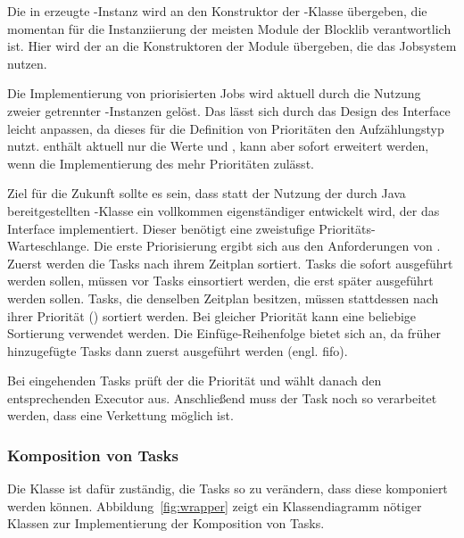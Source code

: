 Die in \classGame{} erzeugte \classBlocklibExecutor{}-Instanz wird an den Konstruktor der \classContext{}-Klasse übergeben, die momentan für die Instanziierung der meisten Module der Blocklib verantwortlich ist. Hier wird der \classBlocklibExecutor{} an die Konstruktoren der Module übergeben, die das Jobsystem nutzen.

Die Implementierung von priorisierten Jobs wird aktuell durch die Nutzung zweier getrennter \classExecutor{}-Instanzen gelöst. Das lässt sich durch das Design des Interface \classBlocklibExecutorService{} leicht anpassen, da dieses für die Definition von Prioritäten den Aufzählungstyp \classTaskPriority{} nutzt. \classTaskPriority{} enthält aktuell nur die Werte  und , kann aber sofort erweitert werden, wenn die Implementierung des \classBlocklibExecutorService{} mehr Prioritäten zulässt. 

Ziel für die Zukunft sollte es sein, dass statt der Nutzung der durch Java bereitgestellten \classScheduledThreadPoolExecutor{}-Klasse ein vollkommen eigenständiger \classExecutorService{} entwickelt wird, der das Interface \classBlocklibExecutorService{} implementiert. Dieser benötigt eine zweistufige Prioritäts-Warteschlange. Die erste Priorisierung ergibt sich aus den Anforderungen von \classScheduledExecutorService{}. Zuerst werden die Tasks nach ihrem Zeitplan sortiert. Tasks die sofort ausgeführt werden sollen, müssen vor Tasks einsortiert werden, die erst später ausgeführt werden sollen. Tasks, die denselben Zeitplan besitzen, müssen stattdessen nach ihrer Priorität (\classTaskPriority{}) sortiert werden. Bei gleicher Priorität kann eine beliebige Sortierung verwendet werden. Die Einfüge-Reihenfolge bietet sich an, da früher hinzugefügte Tasks dann zuerst ausgeführt werden (engl. \ac{fifo}).

Bei eingehenden Tasks prüft der \classBlocklibExecutor{} die Priorität und wählt danach den entsprechenden Executor aus. Anschließend muss der Task noch so verarbeitet werden, dass eine Verkettung möglich ist.

\subsubsection{Komposition von Tasks}\label{sec:Verkettung}
Die Klasse \classCompletableFutureWrapper{} ist dafür zuständig, die Tasks so zu verändern, dass diese komponiert werden können. Abbildung~\ref{fig:wrapper} zeigt ein Klassendiagramm nötiger Klassen zur Implementierung der Komposition von Tasks. 

